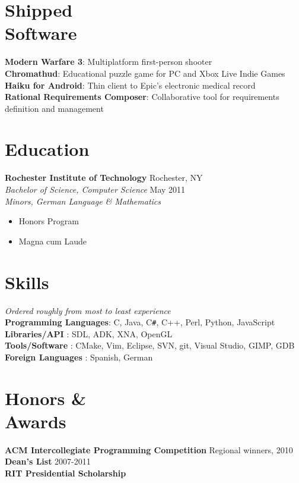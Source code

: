 \documentclass[line,margin]{res}
\newcommand{\CS}{C\texttt{\#}}
\begin{document}
\begin{resume}
\section{\sc Shipped \\ Software}
    \textbf{Modern Warfare 3}: Multiplatform first-person shooter \\
    \textbf{Chromathud}: Educational puzzle game for PC and Xbox Live Indie Games \\
    \textbf{Haiku for Android}: Thin client to Epic's electronic medical record  \\
    \textbf{Rational Requirements Composer}: Collaborative tool for requirements definition and management
 
\section{\sc Education}          
    \textbf{Rochester Institute of Technology}     \hfill  Rochester, NY  \\        
    \textit{Bachelor of Science, Computer Science} \hfill May 2011    \\
    \textit{Minors, German Language \& Mathematics} 
    \begin{itemize} \itemsep -4pt
        \item Honors Program 
        \item Magna cum Laude 
    \end{itemize}


\section{\sc Skills}          
    \textit{\small Ordered roughly from most to least experience}                           \\
    \textbf{Programming Languages}: C, Java, \CS, C++, Perl, Python, JavaScript             \\
    \textbf{Libraries/API        }: SDL, ADK, XNA, OpenGL                                   \\
    \textbf{Tools/Software       }: CMake, Vim, Eclipse, SVN, git, Visual Studio, GIMP, GDB \\
    \textbf{Foreign Languages    }: Spanish, German

\section{\sc Honors \& \\ Awards}          
    \textbf{ACM Intercollegiate Programming Competition} \hfill Regional winners, 2010              \\
    \textbf{Dean's List} \hfill                                              2007-2011              \\
    \textbf{RIT Presidential Scholarship}                                                           
 

\end{resume}
\end{document}
